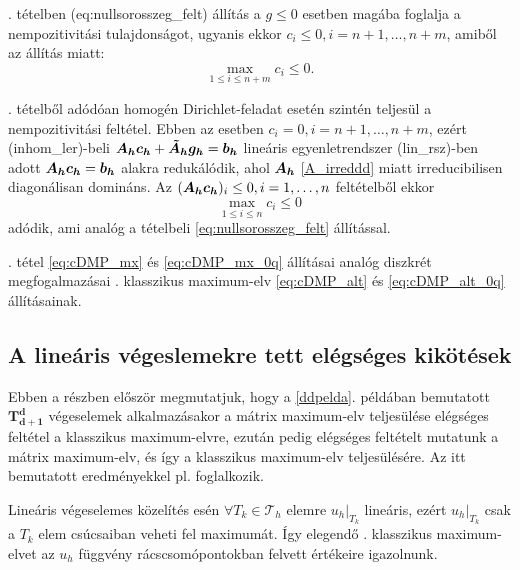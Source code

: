 \begin{remark}
	. tételben \aref({eq:nullsorosszeg_felt}) állítás a $g \leq 0$ esetben magába foglalja a nempozitivitási tulajdonságot, ugyanis ekkor $c_i \leq 0, i = n+1, \ldots ,n+m$, amiből az állítás miatt:
	\begin{equation*}
		\max_{1 \leq i \leq n+m} c_i \leq 0.
	\end{equation*}
\end{remark}	
	
\begin{remark}
	. tételből adódóan homogén Dirichlet-feladat esetén szintén teljesül a nempozitivitási feltétel. Ebben az esetben  $c_i = 0, i = n+1, \ldots ,n+m$, ezért \aref({inhom_ler})-beli $\bm{A_h}\bm{c_h} + \bm{\tilde{A}_h} \bm{g_h} = \bm{b_h}$ lineáris egyenletrendszer \aref({lin_rsz})-ben adott $\bm{A_h}\bm{c_h} = \bm{b_h}$ alakra redukálódik, ahol $\bm{A_h}$ \ref{A_irreddd} miatt irreducibilisen diagonálisan domináns. Az $(\bm{A_h}\bm{c_h})_i \leq 0, i = 1, \ldots, n$ feltételből ekkor
	\begin{equation*}
		\max_{1 \leq i \leq n} c_i \leq 0
	\end{equation*}
	adódik, ami analóg a tételbeli \eqref{eq:nullsorosszeg_felt} állítással.
\end{remark}	

\begin{remark}
	. tétel \eqref{eq:cDMP_mx} és  \eqref{eq:cDMP_mx_0q} állításai analóg diszkrét megfogalmazásai  . klasszikus maximum-elv \eqref{eq:cDMP_alt} és \eqref{eq:cDMP_alt_0q} állításainak. 
\end{remark}	





\subsection{A lineáris végeslemekre tett elégséges kikötések}

Ebben a részben először megmutatjuk, hogy a \ref{ddpelda}. példában bemutatott $\mathbf{T_{d+1}^d}$ végeselemek alkalmazásakor a mátrix maximum-elv teljesülése elégséges feltétel a klasszikus maximum-elvre, ezután pedig elégséges feltételt mutatunk a mátrix maximum-elv, és így a klasszikus maximum-elv teljesülésére. Az itt bemutatott eredményekkel  pl. \cite{ciarlet-raviart} foglalkozik.

Lineáris végeselemes közelítés esén $\forall T_k \in \mathcal{T}_h$ elemre $u_h|_{T_k}$ lineáris, ezért $u_h|_{T_k}$ csak a $T_k$ elem csúcsaiban veheti fel maximumát. Így elegendő . klasszikus maximum-elvet az $u_h$ függvény rácscsomópontokban felvett értékeire igazolnunk.


